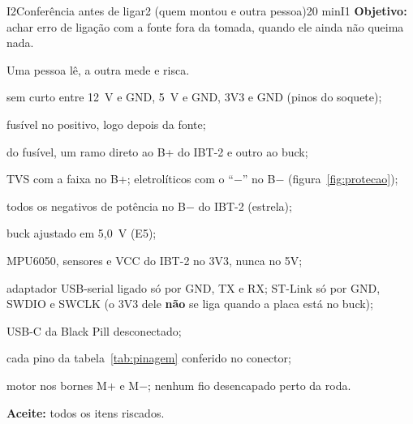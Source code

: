 \documentclass[11pt,a4paper]{article}
\newcommand{\objetivo}[1]{{\color{azul!70!black}\textbf{Objetivo:} #1}\par\smallskip}
\begin{document}
\begin{tarefa}[int]{I2}{Conferência antes de ligar}{2 (quem montou e outra pessoa)}{20 min}{I1}
\objetivo{achar erro de ligação com a fonte fora da tomada, quando ele ainda não queima nada.}
Uma pessoa lê, a outra mede e risca.
\begin{checklist}
  \item sem curto entre 12~V e GND, 5~V e GND, 3V3 e GND (pinos do soquete);
  \item fusível no positivo, logo depois da fonte;
  \item do fusível, um ramo direto ao B+ do IBT-2 e outro ao buck;
  \item TVS com a faixa no B+; eletrolíticos com o ``$-$'' no B$-$
    (figura~\ref{fig:protecao});
  \item todos os negativos de potência no B$-$ do IBT-2 (estrela);
  \item buck ajustado em 5,0~V (E5);
  \item MPU6050, sensores e VCC do IBT-2 no 3V3, nunca no 5V;
  \item adaptador USB-serial ligado só por GND, TX e RX; ST-Link só por GND, SWDIO e SWCLK
    (o 3V3 dele \textbf{não} se liga quando a placa está no buck);
  \item USB-C da Black Pill desconectado;
  \item cada pino da tabela~\ref{tab:pinagem} conferido no conector;
  \item motor nos bornes M+ e M$-$; nenhum fio desencapado perto da roda.
\end{checklist}
\textbf{Aceite:} todos os itens riscados.
\end{tarefa}
\end{document}
